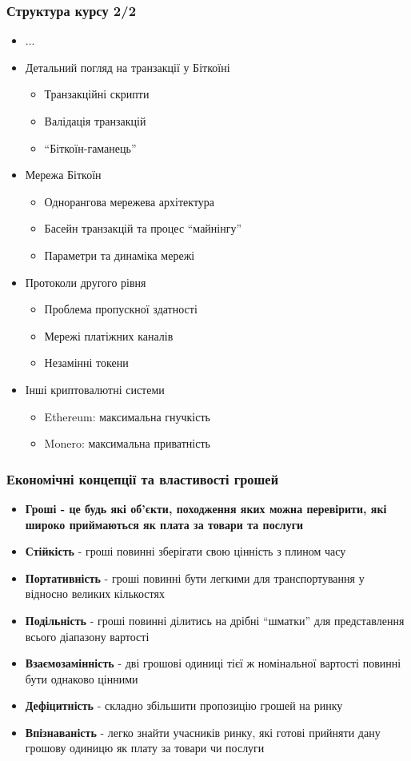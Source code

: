 \documentclass{beamer}
\begin{document}
\begin{frame}
  \frametitle{Структура курсу 2/2}
  \begin{itemize}
  \item[] ...
  \item Детальний погляд на транзакції у Біткоїні
    \begin{itemize}
    \item Транзакційні скрипти
    \item Валідація транзакцій
    \item ``Біткоїн-гаманець''
    \end{itemize}
  \item Мережа Біткоїн
    \begin{itemize}
    \item Однорангова мережева архітектура
    \item Басейн транзакцій та процес ``майнінгу''
    \item Параметри та динаміка мережі
    \end{itemize}
  \item Протоколи другого рівня
    \begin{itemize}
    \item Проблема пропускної здатності
    \item Мережі платіжних каналів
    \item Незамінні токени
    \end{itemize}
  \item Інші криптовалютні системи
    \begin{itemize}
    \item Ethereum: максимальна гнучкість
    \item Monero: максимальна приватність
    \end{itemize}
  \end{itemize}
\end{frame}

\begin{frame}
  \frametitle{Економічні концепції та властивості грошей}
  \begin{itemize}
  \item \textbf{Гроші - це будь які об'єкти, походження яких можна перевірити,
      які широко приймаються як плата за товари та послуги}
  \item \textbf{Стійкість} - гроші повинні зберігати свою цінність з плином часу
  \item \textbf{Портативність} - гроші повинні бути легкими для транспортування
    у відносно великих кількостях
  \item \textbf{Подільність} - гроші повинні ділитись на дрібні ``шматки'' для
    представлення всього діапазону вартості
  \item \textbf{Взаємозамінність} - дві грошові одиниці тієї ж номінальної
    вартості повинні бути однаково цінними
  \item \textbf{Дефіцитність} - складно збільшити пропозицію грошей на ринку
  \item \textbf{Впізнаваність} - легко знайти учасників ринку, які готові
    прийняти дану грошову одиницю як плату за товари чи послуги
  \end{itemize}
\end{frame}
\end{document}
